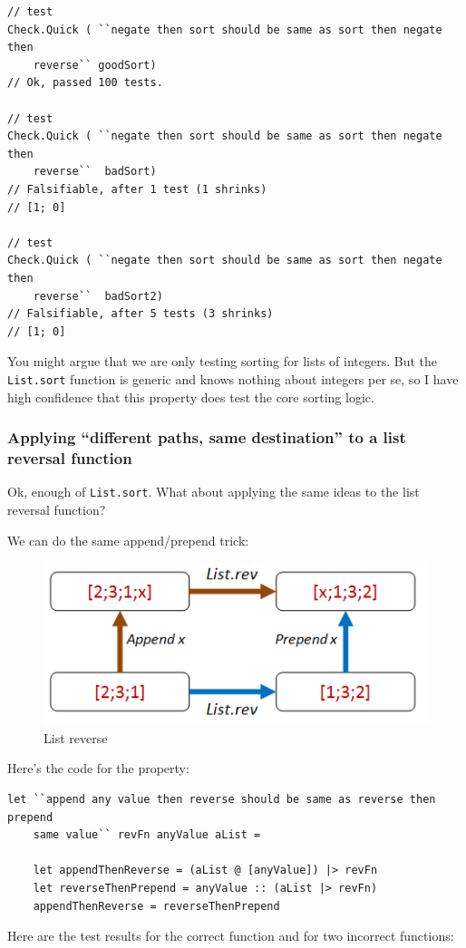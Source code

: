 \begin{verbatim}
// test
Check.Quick ( ``negate then sort should be same as sort then negate then 
    reverse`` goodSort)
// Ok, passed 100 tests.

// test
Check.Quick ( ``negate then sort should be same as sort then negate then 
    reverse``  badSort)
// Falsifiable, after 1 test (1 shrinks) 
// [1; 0]

// test
Check.Quick ( ``negate then sort should be same as sort then negate then 
    reverse``  badSort2)
// Falsifiable, after 5 tests (3 shrinks) 
// [1; 0]
\end{verbatim}
You might argue that we are only testing sorting for lists of integers. But the \texttt{List.sort} function is generic and knows nothing about integers per se, so I have high confidence that this property does test the core sorting logic.




\subsubsection{Applying ``different paths, same destination'' to a list
reversal function}\label{applying-different-paths-same-destination-to-a-list-reversal-function}

Ok, enough of \texttt{List.sort}. What about applying the same ideas to
the list reversal function?

We can do the same append/prepend trick:

\begin{figure}[htbp]
\centering
\includegraphics{pics/property_list_rev.png}
\caption{List reverse}
\end{figure}

Here's the code for the property:

\begin{verbatim}
let ``append any value then reverse should be same as reverse then prepend 
    same value`` revFn anyValue aList = 
  
	let appendThenReverse = (aList @ [anyValue]) |> revFn 
	let reverseThenPrepend = anyValue :: (aList |> revFn)
	appendThenReverse = reverseThenPrepend 
\end{verbatim}
Here are the test results for the correct function and for two incorrect
functions:

